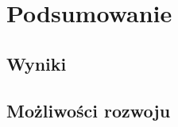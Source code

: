 \documentclass{mini}
\begin{document}
\pagebreak

\section{Podsumowanie}

\subsection{Wyniki}

\subsection{Możliwości rozwoju}

\pagebreak

\begin{thebibliography}{9}

\end{thebibliography}

\makestatement
\end{document}
